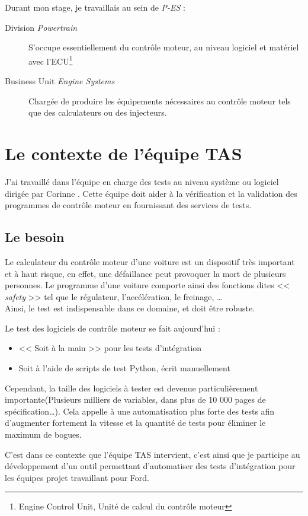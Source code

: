 Durant mon stage, je travaillais au sein de \textit{P-ES} : 
\begin{description}
	\item[Division \textit{Powertrain}] S'occupe essentiellement du contrôle moteur, au niveau logiciel et matériel avec l'ECU\footnote{Engine Control Unit, Unité de calcul du contrôle moteur}
	\item[Business Unit \textit{Engine Systems}] Chargée de produire les équipements nécessaires au contrôle moteur tels que des calculateurs ou des injecteurs.
\end{description}

	\section{Le contexte de l'équipe TAS}
		J'ai travaillé dans l'équipe en charge des tests au niveau système ou logiciel dirigée par Corinne . Cette équipe doit aider à la vérification et la validation des programmes de contrôle moteur en fournissant des services de tests. 
		
 		\subsection{Le besoin} \label{besoinTests}
 		Le calculateur du contrôle moteur d'une voiture est un dispositif très important et à haut risque, en effet, une défaillance peut provoquer la mort de plusieurs personnes. Le programme d'une voiture comporte ainsi des fonctions dites << \textit{safety} >> tel que le régulateur, l'accélération, le freinage, \ldots\\
 		 Ainsi, le test est indispensable dans ce domaine, et doit être robuste. 

Le test des logiciels de contrôle moteur se fait aujourd'hui : 
\begin{itemize}
	\item << Soit à la main >> pour les tests d'intégration
	\item Soit à l'aide de scripts de test Python, écrit manuellement
\end{itemize}
Cependant, la taille des logiciels à tester est devenue particulièrement importante(Plusieurs milliers de variables, dans plus de 10 000 pages de spécification\ldots). Cela appelle à une automatisation plus forte des tests afin d'augmenter fortement la vitesse et la quantité de tests pour éliminer le maximum de bogues.

C'est dans ce contexte que l'équipe TAS intervient, c'est ainsi que je participe au développement d'un outil permettant d'automatiser des tests d'intégration pour les équipes projet travaillant pour Ford.
